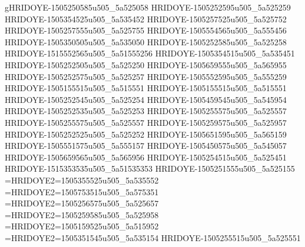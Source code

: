 gHRIDOYE-1505250585u505_5a525058
HRIDOYE-1505252595u505_5a525259
HRIDOYE-1505354525u505_5a535452
HRIDOYE-1505257525u505_5a525752
HRIDOYE-1505257555u505_5a525755
HRIDOYE-1505554565u505_5a555456
HRIDOYE-1505350505u505_5a535050
HRIDOYE-1505252585u505_5a525258
HRIDOYE-1515552565u505_5a51555256
HRIDOYE-1505354515u505_5a535451
HRIDOYE-1505252505u505_5a525250
HRIDOYE-1505659555u505_5a565955
HRIDOYE-1505252575u505_5a525257
HRIDOYE-1505552595u505_5a555259
HRIDOYE-1505155515u505_5a515551
HRIDOYE-1505155515u505_5a515551
HRIDOYE-1505252545u505_5a525254
HRIDOYE-1505459545u505_5a545954
HRIDOYE-1505252535u505_5a525253
HRIDOYE-1505255575u505_5a525557
HRIDOYE-1505255575u505_5a525557
HRIDOYE-1505259575u505_5a525957
HRIDOYE-1505252525u505_5a525252
HRIDOYE-1505651595u505_5a565159
HRIDOYE-1505551575u505_5a555157
HRIDOYE-1505450575u505_5a545057
HRIDOYE-1505659565u505_5a565956
HRIDOYE-1505254515u505_5a525451
HRIDOYE-1515353535u505_5a51535353
HRIDOYE-1505251555u505_5a525155
=HRIDOYE2=1505355525u505_5a535552
=HRIDOYE2=1505753515u505_5a575351
=HRIDOYE2=1505256575u505_5a525657
=HRIDOYE2=1505259585u505_5a525958
=HRIDOYE2=1505159525u505_5a515952
=HRIDOYE2=1505351545u505_5a535154
HRIDOYE-1505255515u505_5a525551
